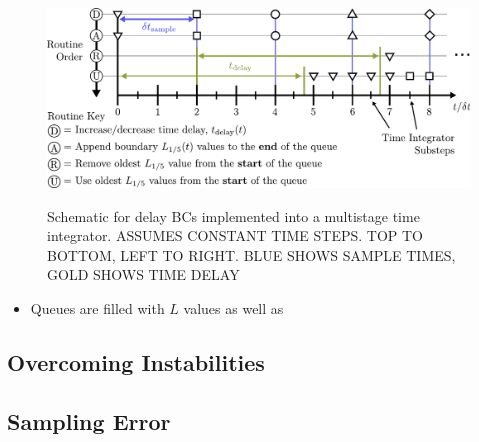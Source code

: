 \begin{figure}[t]
\centering
\includegraphics[scale=0.6]{assets/imgs/delay_bc_code_schematic.pdf}
\label{fig:schematic}
\caption{Schematic for delay BCs implemented into a multistage time integrator. ASSUMES CONSTANT TIME STEPS. TOP TO BOTTOM, LEFT TO RIGHT. BLUE SHOWS SAMPLE TIMES, GOLD SHOWS TIME DELAY}
\end{figure}


\begin{itemize}
\item Queues are filled with $L$ values as well as 
\end{itemize}



\subsection{Overcoming Instabilities}



\subsection{Sampling Error}




